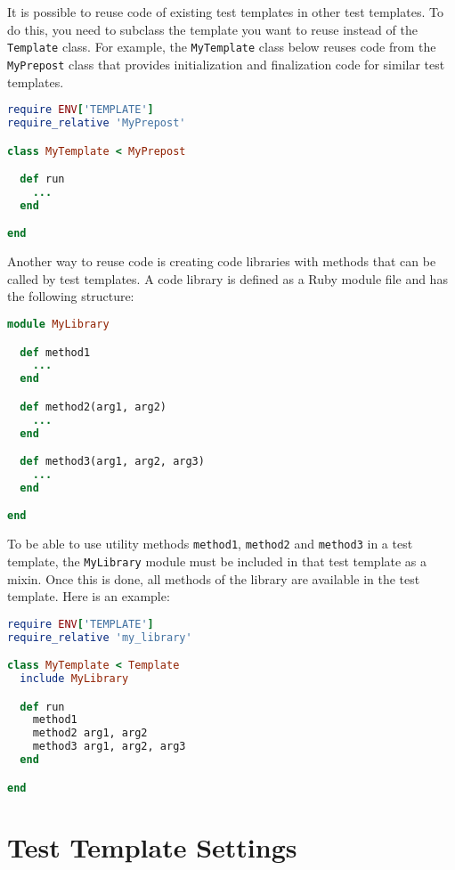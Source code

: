 \documentclass[oneside,final,12pt]{extreport}
\begin{document}
It is possible to reuse code of existing test templates in other test templates.
To do this, you need to subclass the template you want to reuse instead of the
\texttt{Template} class. For example, the \texttt{MyTemplate} class below reuses code from
the \texttt{MyPrepost} class that provides initialization and finalization code for similar
test templates.

\begin{lstlisting}[language=ruby]
require ENV['TEMPLATE']
require_relative 'MyPrepost'

class MyTemplate < MyPrepost

  def run
    ... 
  end

end
\end{lstlisting}

Another way to reuse code is creating code libraries with methods that can be called
by test templates. A code library is defined as a Ruby module file and has the following
structure:

\begin{lstlisting}[language=ruby]
module MyLibrary

  def method1
    ...
  end

  def method2(arg1, arg2)
    ...
  end

  def method3(arg1, arg2, arg3)
    ...
  end

end
\end{lstlisting}

To be able to use utility methods \texttt{method1}, \texttt{method2} and \texttt{method3}
in a test template, the \texttt{MyLibrary} module must be included in that test template as a mixin.
Once this is done, all methods of the library are available in the test template.
Here is an example:

\begin{lstlisting}[language=ruby]
require ENV['TEMPLATE']
require_relative 'my_library'

class MyTemplate < Template
  include MyLibrary

  def run
    method1
    method2 arg1, arg2
    method3 arg1, arg2, arg3
  end

end
\end{lstlisting}


\section{Test Template Settings}
\end{document}
